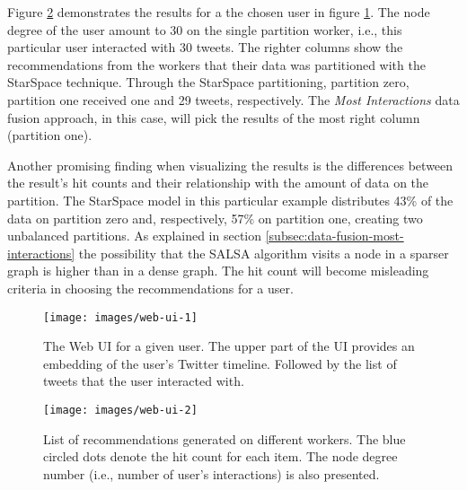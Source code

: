 Figure \ref{fig:web-ui-example-2} demonstrates the results for a the chosen user in figure \ref{fig:web-ui-example-1}. The node degree of the user amount to 30 on the single partition worker, i.e., this particular user interacted with 30 tweets. The righter columns show the recommendations from the workers that their data was partitioned with the StarSpace technique. Through the StarSpace partitioning, partition zero, partition one received one and 29 tweets, respectively. The \emph{Most Interactions} data fusion approach, in this case, will pick the results of the most right column (partition one).


Another promising finding when visualizing the results is the differences between the result's hit counts and their relationship with the amount of data on the partition. The StarSpace model in this particular example distributes 43\% of the data on partition zero and, respectively, 57\% on partition one, creating two unbalanced partitions. As explained in section \ref{subsec:data-fusion-most-interactions} the possibility that the SALSA algorithm visits a node in a sparser graph is higher than in a dense graph. The hit count will become misleading criteria in choosing the recommendations for a user.

\begin{figure}[!htb]
    \centering
    \texttt{[image: images/web-ui-1]}
    \caption{The Web UI for a given user. The upper part of the UI provides an embedding of the user's Twitter timeline. Followed by the list of tweets that the user interacted with.}
    \label{fig:web-ui-example-1}
\end{figure}

\begin{figure}[!htb]
    \centering
    \texttt{[image: images/web-ui-2]}
    \caption{List of recommendations generated on different workers. The blue circled dots denote the hit count for each item. The node degree number (i.e., number of user's interactions) is also presented.}
    \label{fig:web-ui-example-2}
\end{figure}
